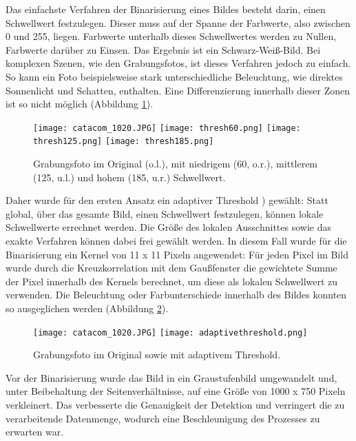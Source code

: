 Das einfachste Verfahren der Binarisierung eines Bildes besteht darin, einen Schwellwert festzulegen. Dieser muss auf der Spanne der Farbwerte, also zwischen 0 und 255, liegen.  Farbwerte unterhalb dieses Schwellwertes werden zu Nullen, Farbwerte darüber zu Einsen. Das Ergebnis ist ein Schwarz-Weiß-Bild. Bei komplexen Szenen, wie den Grabungsfotos, ist dieses Verfahren jedoch zu einfach. So kann ein Foto beispielsweise stark unterschiedliche Beleuchtung, wie direktes Sonnenlicht und Schatten, enthalten. Eine Differenzierung innerhalb dieser Zonen ist so nicht möglich (Abbildung \ref{fig:threshold}).\\
\begin{figure}[h!]
\texttt{[image: catacom\_1020.JPG]}
\texttt{[image: thresh60.png]}
\texttt{[image: thresh125.png]}
\texttt{[image: thresh185.png]}
\caption{Grabungsfoto im Original (o.l.), mit niedrigem (60, o.r.), mittlerem (125, u.l.) und hohem (185, u.r.) Schwellwert.}
\label{fig:threshold}
\end{figure}
Daher wurde für den ersten Ansatz ein adaptiver Threshold \cite{opencvadaptivethreshold}) gewählt: Statt global, über das gesamte Bild, einen Schwellwert festzulegen, können lokale Schwellwerte errechnet werden. Die Größe des lokalen Ausschnittes sowie das exakte Verfahren können dabei frei gewählt werden. %
In diesem Fall wurde für die Binarisierung ein Kernel von 11 x 11 Pixeln angewendet: Für jeden Pixel im Bild wurde durch die Kreuzkorrelation mit dem Gaußfenster die gewichtete Summe der Pixel innerhalb des Kernels berechnet, um diese als lokalen Schwellwert zu verwenden.
Die Beleuchtung oder Farbunterschiede innerhalb des Bildes konnten so ausgeglichen werden (Abbildung \ref{fig:adaptivethreshold}).

\begin{figure}[h!]
\texttt{[image: catacom\_1020.JPG]}
\texttt{[image: adaptivethreshold.png]}
\caption{Grabungsfoto im Original sowie mit adaptivem Threshold.}
\label{fig:adaptivethreshold}
\end{figure}
Vor der Binarisierung wurde das Bild in ein Graustufenbild umgewandelt und, unter Beibehaltung der Seitenverhältnisse, auf eine Größe von 1000 x 750 Pixeln verkleinert. Das verbesserte die Genauigkeit der Detektion und verringert die zu verarbeitende Datenmenge, wodurch eine Beschleunigung des Prozesses zu erwarten war. %

